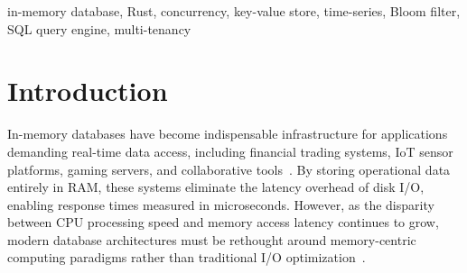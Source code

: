 \documentclass[conference,a4paper]{IEEEtran}
\begin{document}
\begin{abstract}
In-memory databases (IMDBs) are essential for modern applications requiring sub-millisecond latency, yet existing systems present a fundamental trade-off: Redis offers feature richness through a single-threaded model that limits scalability, while Memcached provides multi-threaded throughput at the expense of functionality. Both, being implemented in C, remain susceptible to memory safety vulnerabilities. This paper presents RivetDB, a high-performance, concurrent in-memory database implemented in Rust that eliminates this trade-off. RivetDB supports over 70 commands across 10 data types---including strings, lists, sets, sorted sets, hashes, JSON documents, Bloom filters, and time-series---all natively within a single binary. It introduces features absent from standard Redis: a built-in SQL-like query engine, unlimited namespace-based multi-tenancy with per-tenant memory isolation, and configurable asynchronous append-only file (AOF) persistence. Built on the Tokio async runtime with DashMap for lock-free concurrent access, RivetDB achieves 14,741 atomic operations per second---43\% faster than Redis on comparable hardware. Benchmark-driven optimization phases yielded a cumulative 100\% improvement in pipelined write throughput. RivetDB demonstrates that Rust's compile-time safety guarantees enable building a multi-threaded, feature-rich database without sacrificing safety, establishing a new design point in the IMDB landscape.
\end{abstract}

\begin{IEEEkeywords}
in-memory database, Rust, concurrency, key-value store, time-series, Bloom filter, SQL query engine, multi-tenancy
\end{IEEEkeywords}

\section{Introduction}

In-memory databases have become indispensable infrastructure for applications demanding real-time data access, including financial trading systems, IoT sensor platforms, gaming servers, and collaborative tools~\cite{larson2006}. By storing operational data entirely in RAM, these systems eliminate the latency overhead of disk I/O, enabling response times measured in microseconds. However, as the disparity between CPU processing speed and memory access latency continues to grow, modern database architectures must be rethought around memory-centric computing paradigms rather than traditional I/O optimization~\cite{chronis2025}.
\end{document}

